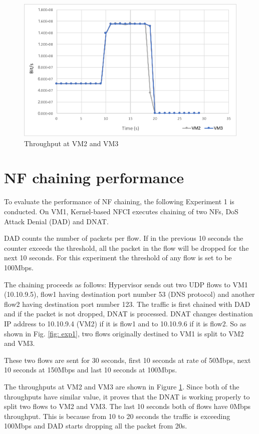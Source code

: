 \begin{figure}
	\centering
	\includegraphics[width=120mm]{pics/throughput.pdf}
	\caption{Throughput at VM2 and VM3}
	\label{fig: result1}
\end{figure}

\section{NF chaining performance}
To evaluate the performance of NF chaining, the following Experiment 1 is conducted. On VM1, Kernel-based NFCI executes chaining of two NFs, DoS Attack Denial (DAD) and DNAT. 

DAD counts the number of packets per flow. If in the previous 10 seconds the counter exceeds the threshold, all the packet in the flow will be dropped for the next 10 seconds. For this experiment the threshold of any flow is set to be 100Mbps. 

The chaining proceeds as follows: Hypervisor sends out two UDP flows to VM1 (10.10.9.5), flow1 having destination port number 53 (DNS protocol) and another flow2 having destination port number 123. The traffic is first chained with DAD and if the packet is not dropped, DNAT is processed. DNAT changes destination IP address to 10.10.9.4 (VM2) if it is flow1 and to 10.10.9.6 if it is flow2. So as shown in Fig. \ref{fig: exp1}, two flows originally destined to VM1 is split to VM2 and VM3. 

These two flows are sent for 30 seconds, first 10 seconds at rate of 50Mbps, next 10 seconds at 150Mbps and last 10 seconds at 100Mbps. 

The throughputs at VM2 and VM3 are shown in Figure \ref{fig: result1}.
Since both of the throughputs have similar value, it proves that the DNAT is working properly to split two flows to VM2 and VM3. The last 10 seconds both of flows have 0Mbps throughput. This is because from 10 to 20 seconds the traffic is exceeding 100Mbps and DAD starts dropping all the packet from 20s. 


